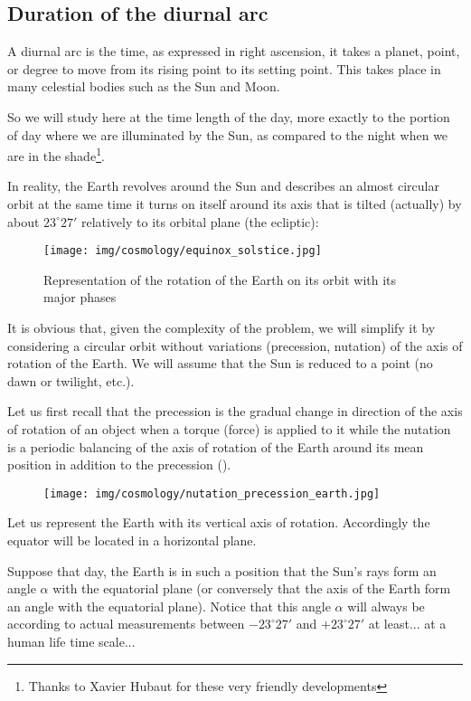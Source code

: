 	\subsection{Duration of the diurnal arc} 
	A diurnal arc is the time, as expressed in right ascension, it takes a planet, point, or degree to move from its rising point to its setting point. This takes place in many celestial bodies such as the Sun and Moon.
	
	So we will study here at the time length of the day, more exactly to the portion of day where we are illuminated by the Sun, as compared to the night when we are in the shade\footnote{Thanks to Xavier Hubaut for these very friendly developments}.
	
	In reality, the Earth revolves around the Sun and describes an almost circular orbit at the same time it turns on itself around its axis that is tilted (actually) by about $23^\circ 27'$ relatively to its orbital plane (the ecliptic):
	\begin{figure}[H]
		\centering
		\texttt{[image: img/cosmology/equinox\_solstice.jpg]}	
		\caption{Representation of the rotation of the Earth on its orbit with its major phases}
	\end{figure}
	\begin{tcolorbox}[title=Remark,colframe=black,arc=10pt]
	It is obvious that, given the complexity of the problem, we will simplify it by considering a circular orbit without variations (precession, nutation) of the axis of rotation of the Earth. We will assume that the Sun is reduced to a point (no dawn or twilight, etc.).
	\end{tcolorbox}
	Let us first recall that the precession is the gradual change in direction of the axis of rotation of an object when a torque (force) is applied to it while the nutation is a periodic balancing of the axis of rotation of the Earth around its mean position in addition to the precession ().
	\begin{figure}[H]
		\centering
		\texttt{[image: img/cosmology/nutation\_precession\_earth.jpg]}
	\end{figure}
	Let us represent the Earth with its vertical axis of rotation. Accordingly the equator will be located in a horizontal plane.

	Suppose that day, the Earth is in such a position that the Sun's rays form an angle $\alpha$ with the equatorial plane (or conversely that the axis of the Earth form an angle with the equatorial plane). Notice that this angle $\alpha$ will always be according to actual measurements  between $-23^\circ 27'$ and $+23^\circ 27'$ at least... at a human life time scale...
	
